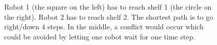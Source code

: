 \documentclass[runningheads]{llncs}
\begin{document}
\begin{figure}[h]
\caption{Robot 1 (the square on the left) has to reach shelf 1 (the circle on the right). Robot 2 has to reach shelf 2. The shortest path is to go right/down 4 steps. In the middle, a conflict would occur which could be avoided by letting one robot wait for one time step.}
\label{fig:mapf}
\end{figure}
\end{document}
